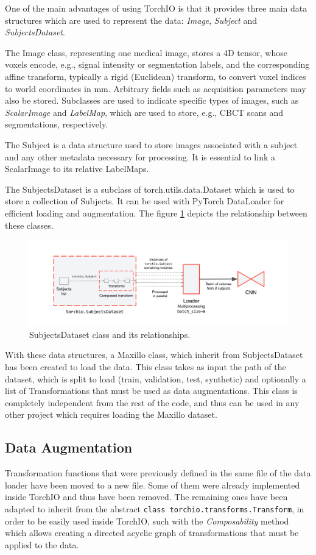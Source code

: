 One of the main advantages of using TorchIO is that it provides three main
data structures which are used to represent the data: \emph{Image},
\emph{Subject} and \emph{SubjectsDataset}.

The Image class, representing one medical image, stores a 4D tensor, whose
voxels encode, e.g., signal intensity or segmentation labels, and the
corresponding affine transform, typically a rigid (Euclidean) transform, to
convert voxel indices to world coordinates in mm. Arbitrary fields such as
acquisition parameters may also be stored. Subclasses are used to indicate
specific types of images, such as \emph{ScalarImage} and \emph{LabelMap}, which
are used to store, e.g., CBCT scans and segmentations, respectively.

The Subject is a data structure used to store images associated with a subject
and any other metadata necessary for processing. It is essential to link a
ScalarImage to its relative LabelMaps.

The SubjectsDataset is a subclass of torch.utils.data.Dataset which is used to
store a collection of Subjects. It can be used with PyTorch DataLoader for
efficient loading and augmentation. The figure \ref{fig:subjectsdataset}
depicts the relationship between these classes.
\begin{figure}[h]
  \centering
  \includegraphics[width=0.9\linewidth]{Images/subjectsdataset.png}
  \caption{SubjectsDataset class and its relationships.}
  \label{fig:subjectsdataset}
\end{figure}

With these data structures, a Maxillo class, which inherit from
SubjectsDataset has been created to load the data. This class takes as input the
path of the dataset, which is split to load (train, validation, test, synthetic)
and optionally a list of Transformations that must be used as data augmentations. This class is completely independent from the rest of the code, and thus can be used in any other project which requires loading the Maxillo dataset.

\subsection{Data Augmentation}
Transformation functions that were previously defined in the same file of the
data loader have been moved to a new file. Some of them were already implemented
inside TorchIO and thus have been removed. The remaining ones have been adapted
to inherit from the abstract \texttt{class torchio.transforms.Transform}, in
order to be easily used inside TorchIO, such with the \emph{Composability}
method which allows creating a directed acyclic graph of transformations that
must be applied to the data.

